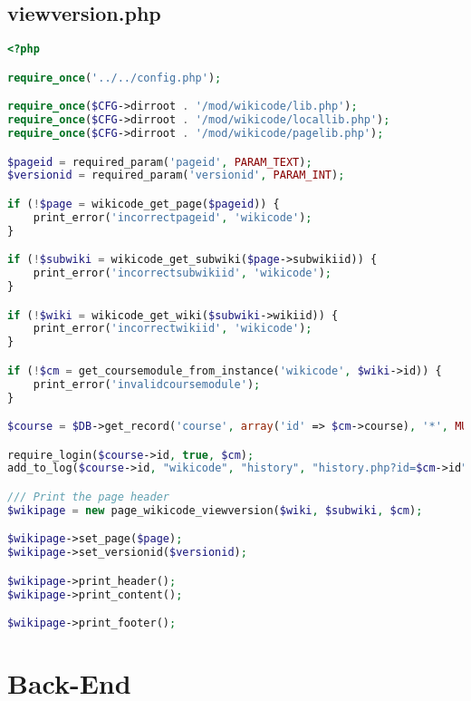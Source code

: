 \subsection{viewversion.php}
\begin{lstlisting}[language=PHP]
<?php

require_once('../../config.php');

require_once($CFG->dirroot . '/mod/wikicode/lib.php');
require_once($CFG->dirroot . '/mod/wikicode/locallib.php');
require_once($CFG->dirroot . '/mod/wikicode/pagelib.php');

$pageid = required_param('pageid', PARAM_TEXT);
$versionid = required_param('versionid', PARAM_INT);

if (!$page = wikicode_get_page($pageid)) {
    print_error('incorrectpageid', 'wikicode');
}

if (!$subwiki = wikicode_get_subwiki($page->subwikiid)) {
    print_error('incorrectsubwikiid', 'wikicode');
}

if (!$wiki = wikicode_get_wiki($subwiki->wikiid)) {
    print_error('incorrectwikiid', 'wikicode');
}

if (!$cm = get_coursemodule_from_instance('wikicode', $wiki->id)) {
    print_error('invalidcoursemodule');
}

$course = $DB->get_record('course', array('id' => $cm->course), '*', MUST_EXIST);

require_login($course->id, true, $cm);
add_to_log($course->id, "wikicode", "history", "history.php?id=$cm->id", "$wiki->id");

/// Print the page header
$wikipage = new page_wikicode_viewversion($wiki, $subwiki, $cm);

$wikipage->set_page($page);
$wikipage->set_versionid($versionid);

$wikipage->print_header();
$wikipage->print_content();

$wikipage->print_footer();
\end{lstlisting}

\section{Back-End}

